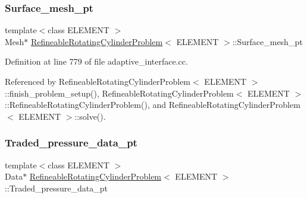 \mbox{\label{classRefineableRotatingCylinderProblem_a48cc95921f8a03c220609d9666bcf406}} 
\subsubsection{\texorpdfstring{Surface\+\_\+mesh\+\_\+pt}{Surface\_mesh\_pt}}
{\footnotesize\ttfamily template$<$class E\+L\+E\+M\+E\+NT $>$ \\
Mesh$\ast$ \hyperlink{classRefineableRotatingCylinderProblem}{Refineable\+Rotating\+Cylinder\+Problem}$<$ E\+L\+E\+M\+E\+NT $>$\+::Surface\+\_\+mesh\+\_\+pt}



Definition at line 779 of file adaptive\+\_\+interface.\+cc.



Referenced by Refineable\+Rotating\+Cylinder\+Problem$<$ E\+L\+E\+M\+E\+N\+T $>$\+::finish\+\_\+problem\+\_\+setup(), Refineable\+Rotating\+Cylinder\+Problem$<$ E\+L\+E\+M\+E\+N\+T $>$\+::\+Refineable\+Rotating\+Cylinder\+Problem(), and Refineable\+Rotating\+Cylinder\+Problem$<$ E\+L\+E\+M\+E\+N\+T $>$\+::solve().

\mbox{\label{classRefineableRotatingCylinderProblem_a712d1cdcab28b62e1df830ffe1818009}} 
\subsubsection{\texorpdfstring{Traded\+\_\+pressure\+\_\+data\+\_\+pt}{Traded\_pressure\_data\_pt}}
{\footnotesize\ttfamily template$<$class E\+L\+E\+M\+E\+NT $>$ \\
Data$\ast$ \hyperlink{classRefineableRotatingCylinderProblem}{Refineable\+Rotating\+Cylinder\+Problem}$<$ E\+L\+E\+M\+E\+NT $>$\+::Traded\+\_\+pressure\+\_\+data\+\_\+pt\hspace{0.3cm}{\ttfamily [private]}}



